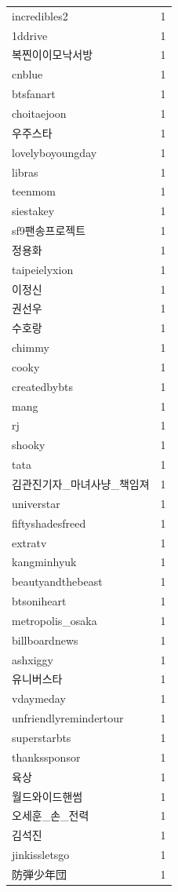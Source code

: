\begin{tabular}{lr}
incredibles2 & 1 \\
1ddrive & 1 \\
복찐이이모낙서방 & 1 \\
cnblue & 1 \\
btsfanart & 1 \\
choitaejoon & 1 \\
우주스타 & 1 \\
lovelyboyoungday & 1 \\
libras & 1 \\
teenmom & 1 \\
siestakey & 1 \\
sf9팬송프로젝트 & 1 \\
정용화 & 1 \\
taipeielyxion & 1 \\
이정신 & 1 \\
권선우 & 1 \\
수호랑 & 1 \\
chimmy & 1 \\
cooky & 1 \\
createdbybts & 1 \\
mang & 1 \\
rj & 1 \\
shooky & 1 \\
tata & 1 \\
김관진기자\_마녀사냥\_책임져 & 1 \\
universtar & 1 \\
fiftyshadesfreed & 1 \\
extratv & 1 \\
kangminhyuk & 1 \\
beautyandthebeast & 1 \\
btsoniheart & 1 \\
metropolis\_osaka & 1 \\
billboardnews & 1 \\
ashxiggy & 1 \\
유니버스타 & 1 \\
vdaymeday & 1 \\
unfriendlyremindertour & 1 \\
superstarbts & 1 \\
thankssponsor & 1 \\
육상 & 1 \\
월드와이드핸썸 & 1 \\
오세훈\_손\_전력 & 1 \\
김석진 & 1 \\
jinkissletsgo & 1 \\
防弾少年団 & 1 \\

\end{tabular}
